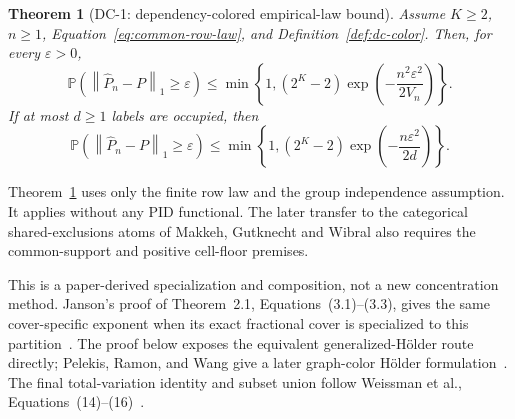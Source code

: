 \documentclass[11pt]{article}
\newtheorem{theorem}{Theorem}[section]
\theoremstyle{definition}
\newcommand{\Phat}{\widehat{P}}
\newcommand{\Prb}{\mathbb{P}}
\newcommand{\normone}[1]{\left\lVert #1\right\rVert_1}
\begin{document}
\begin{theorem}[DC-1: dependency-colored empirical-law bound]\label{thm:finite}
Assume $K\ge2$, $n\ge1$, Equation~\eqref{eq:common-row-law}, and
Definition~\ref{def:dc-color}.  Then, for every $\varepsilon>0$,
\begin{equation}\label{eq:finite}
  \Prb\!\left(\normone{\Phat_n-P}\ge\varepsilon\right)
  \le
  \min\!\left\{
    1,
    (2^K-2)\exp\!\left(-\frac{n^2\varepsilon^2}{2V_n}\right)
  \right\}.
\end{equation}
If at most $d\ge1$ labels are occupied, then
\begin{equation}\label{eq:coarse}
  \Prb\!\left(\normone{\Phat_n-P}\ge\varepsilon\right)
  \le
  \min\!\left\{
    1,
    (2^K-2)\exp\!\left(-\frac{n\varepsilon^2}{2d}\right)
  \right\}.
\end{equation}
\end{theorem}

Theorem~\ref{thm:finite} uses only the finite row law and the group independence assumption. It applies without any PID functional. The later transfer to the categorical shared-exclusions atoms of Makkeh, Gutknecht and Wibral also requires the common-support and positive cell-floor premises.

This is a paper-derived specialization and composition, not a new concentration method.  Janson's
proof of Theorem~2.1, Equations~(3.1)--(3.3), gives the same cover-specific exponent when its exact
fractional cover is specialized to this partition~\cite{janson2004}.  The proof below exposes the
equivalent generalized-H{\"o}lder route directly; Pelekis, Ramon, and Wang give a later
graph-color H{\"o}lder formulation~\cite{pelekis2017}.  The final total-variation identity and
subset union follow Weissman et al., Equations~(14)--(16)~\cite{weissman2003}.
\end{document}
